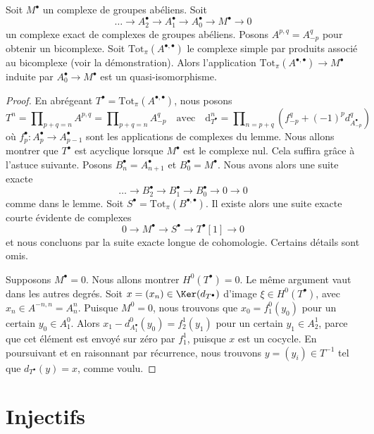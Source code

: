 \begin{lemma}
\label{lemma-resolution-gives-qis}
Soit $M^\bullet$ un complexe de groupes abéliens. Soit
$$
\ldots \to A_2^\bullet \to A_1^\bullet \to A_0^\bullet \to M^\bullet \to 0
$$
un complexe exact de complexes de groupes abéliens. Posons
$A^{p, q} = A_{-p}^q$ pour obtenir un bicomplexe. Soit
$\text{Tot}_\pi(A^{\bullet, \bullet})$
le complexe simple par produits associé au bicomplexe (voir la démonstration).
Alors l'application $\text{Tot}_\pi(A^{\bullet, \bullet}) \to M^\bullet$
induite par $A_0^\bullet \to M^\bullet$ est un quasi-isomorphisme.
\end{lemma}

\begin{proof}
En abrégeant $T^\bullet = \text{Tot}_\pi(A^{\bullet, \bullet})$,
nous posons
$$
T^n = \prod\nolimits_{p + q = n} A^{p, q} =
\prod\nolimits_{p + q = n} A_{-p}^q
\quad\text{avec}\quad
\text{d}_{T^\bullet}^n =
\prod\nolimits_{n = p + q} (f_{-p}^q + (-1)^pd_{A_{-p}^\bullet}^q)
$$
où $f_p^\bullet : A_p^\bullet \to A_{p - 1}^\bullet$
sont les applications de complexes du lemme.
Nous allons montrer que $T^\bullet$ est acyclique lorsque
$M^\bullet$ est le complexe nul. Cela suffira grâce à l'astuce suivante.
Posons $B_n^\bullet = A_{n + 1}^\bullet$
et $B_0^\bullet = M^\bullet$. Nous avons alors une suite exacte
$$
\ldots \to B_2^\bullet \to B_1^\bullet \to B_0^\bullet \to 0 \to 0
$$
comme dans le lemme. Soit $S^\bullet = \text{Tot}_\pi(B^{\bullet, \bullet})$.
Il existe alors une suite exacte courte évidente de complexes
$$
0 \to M^\bullet \to S^\bullet \to T^\bullet[1] \to 0
$$
et nous concluons par la suite exacte longue de cohomologie. Certains
détails sont omis.

\medskip\noindent
Supposons $M^\bullet = 0$. Nous allons montrer $H^0(T^\bullet) = 0$. Le même
argument vaut dans les autres degrés. Soit
$x =(x_n) \in \Ker(d_{T^\bullet})$ d'image $\xi \in H^0(T^\bullet)$,
avec $x_n \in A^{-n, n} = A_n^n$.
Puisque $M^0 = 0$, nous trouvons que $x_0 = f_1^0(y_0)$ pour un certain
$y_0 \in A_1^0$.
Alors $x_1 - d^0_{A_1^\bullet}(y_0) = f_2^1(y_1)$ pour un certain
$y_1 \in A_2^1$, parce que cet élément est envoyé sur zéro par $f_1^1$,
puisque $x$ est un cocycle. En poursuivant et en raisonnant
par récurrence, nous trouvons
$y = (y_i) \in T^{-1}$ tel que $d_{T^\bullet}(y) = x$, comme voulu.
\end{proof}

\section{Injectifs}
\label{section-injectives}

